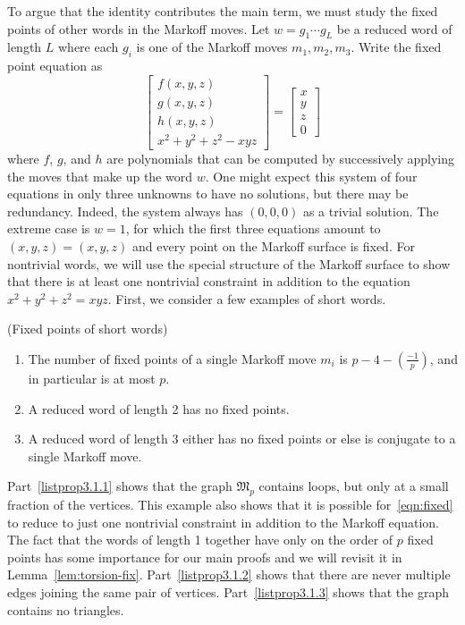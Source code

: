 \documentclass[AHL, Unicode, longabstracts, published]{cedram}
\begin{document}
To argue that the identity contributes the main term, we must study the fixed points of other words in the Markoff moves. Let $w = g_1 \cdots g_L$ be a reduced word of length $L$ where each $g_i$ is one of the Markoff moves $m_1, m_2, m_3$. Write the fixed point equation as
\begin{equation}\label{eqn:fixed}
\begin{bmatrix}
f(x,y,z) \\
g(x,y,z) \\
h(x,y,z) \\
x^2+y^2+z^2-xyz
\end{bmatrix} =
\begin{bmatrix}
x \\
y \\
z \\
0
\end{bmatrix}
\end{equation}
where $f$, $g$, and $h$ are polynomials that can be computed by successively applying the moves that make up the word $w$. One might expect this system of four equations in only three unknowns to have no solutions, but there may be redundancy. Indeed, the system always has $(0,0,0)$ as a trivial solution. The extreme case is $w=1$, for which the first three equations amount to $(x,y,z)=(x,y,z)$ and every point on the Markoff surface is fixed. For nontrivial words, we will use the special structure of the Markoff surface to show that there is at least one nontrivial constraint in addition to the equation $x^2+y^2+z^2=xyz$. First, we consider a few examples of short words.


\begin{prop}\label{prop:examples}
(Fixed points of short words)
\begin{enumerate}
\item \label{listprop3.1.1} The number of fixed points of a single Markoff move $m_i$ is $p - 4 - (\tfrac{-1}{p})$, and in particular is at most $p$.
\item \label{listprop3.1.2} A reduced word of length 2 has no fixed points.
\item \label{listprop3.1.3} A reduced word of length 3 either has no fixed points or else is conjugate to a single Markoff move.
\end{enumerate}
\end{prop}

Part~\eqref{listprop3.1.1} shows that the graph $\mathfrak{M}_p$ contains loops, but only at a small fraction of the vertices. This example also shows that it is possible for~\eqref{eqn:fixed} to reduce to just one nontrivial constraint in addition to the Markoff equation. The fact that the words of length 1 together have only on the order of $p$ fixed points has some importance for our main proofs and we will revisit it in Lemma~\ref{lem:torsion-fix}. Part~\eqref{listprop3.1.2} shows that there are never multiple edges joining the same pair of vertices. Part~\eqref{listprop3.1.3} shows that the graph contains no triangles.
\end{document}
